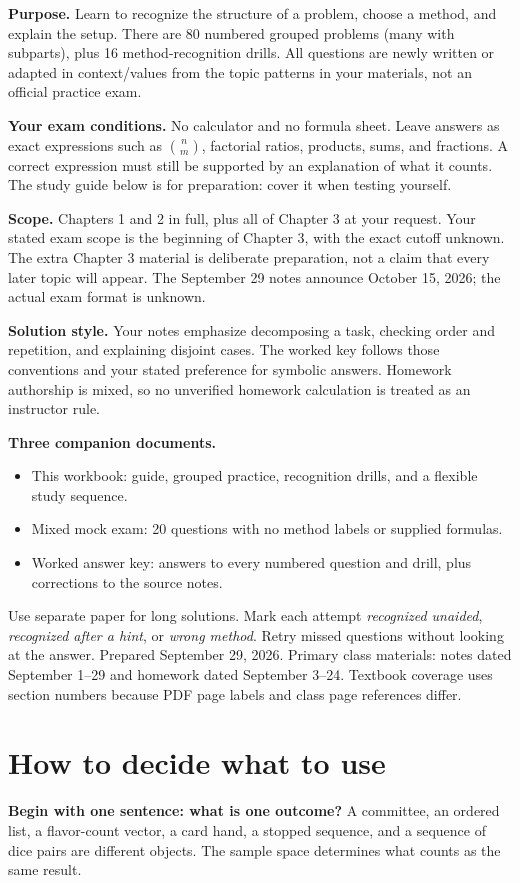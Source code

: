 \documentclass[11pt]{article}
\newcommand{\source}[1]{{\small\color{muted}#1}\par}
\newcommand{\studytitle}[2]{\thispagestyle{empty}{\color{accent}\large MTH 241 / EXAM PREPARATION}\par\vspace{0.4in}{\color{ink}\Huge\bfseries #1\par}\vspace{0.15in}{\large #2\par}\vspace{0.25in}}
\begin{document}
\studytitle{Grouped practice workbook}{Chapters 1, 2, and 3 / Sheldon Ross, 10th edition}
\textbf{Purpose.} Learn to recognize the structure of a problem, choose a method, and explain the setup. There are 80 numbered grouped problems (many with subparts), plus 16 method-recognition drills. All questions are newly written or adapted in context/values from the topic patterns in your materials, not an official practice exam.

\textbf{Your exam conditions.} No calculator and no formula sheet. Leave answers as exact expressions such as \(\binom nm\), factorial ratios, products, sums, and fractions. A correct expression must still be supported by an explanation of what it counts. The study guide below is for preparation: cover it when testing yourself.

\textbf{Scope.} Chapters 1 and 2 in full, plus all of Chapter 3 at your request. Your stated exam scope is the beginning of Chapter 3, with the exact cutoff unknown. The extra Chapter 3 material is deliberate preparation, not a claim that every later topic will appear. The September 29 notes announce October 15, 2026; the actual exam format is unknown.

\textbf{Solution style.} Your notes emphasize decomposing a task, checking order and repetition, and explaining disjoint cases. The worked key follows those conventions and your stated preference for symbolic answers. Homework authorship is mixed, so no unverified homework calculation is treated as an instructor rule.

\textbf{Three companion documents.}
\begin{itemize}
\item This workbook: guide, grouped practice, recognition drills, and a flexible study sequence.
\item Mixed mock exam: 20 questions with no method labels or supplied formulas.
\item Worked answer key: answers to every numbered question and drill, plus corrections to the source notes.
\end{itemize}
Use separate paper for long solutions. Mark each attempt \emph{recognized unaided}, \emph{recognized after a hint}, or \emph{wrong method}. Retry missed questions without looking at the answer.
\vfill\source{Prepared September 29, 2026. Primary class materials: notes dated September 1--29 and homework dated September 3--24. Textbook coverage uses section numbers because PDF page labels and class page references differ.}
\clearpage
\section*{How to decide what to use}
\textbf{Begin with one sentence: what is one outcome?} A committee, an ordered list, a flavor-count vector, a card hand, a stopped sequence, and a sequence of dice pairs are different objects. The sample space determines what counts as the same result.
\end{document}
